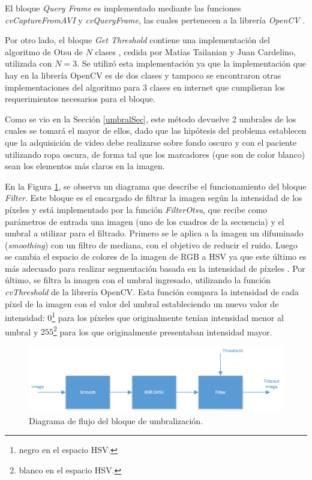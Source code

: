 El bloque \emph{Query Frame} es implementado mediante las funciones \emph{cvCaptureFromAVI} y \emph{cvQueryFrame}, las cuales pertenecen a la librería \emph{OpenCV} \cite{opencv}.


Por otro lado, el bloque \emph{Get Threshold} contiene una implementación del algoritmo de Otsu de $N$ clases \cite{implementacionOtsu}, cedida por Matías Tailanian y Juan Cardelino, utilizada con $N=3$. Se utilizó esta implementación ya que la implementación que hay en la librería OpenCV es de dos clases y tampoco se encontraron otras implementaciones del algoritmo para 3 clases en internet que cumplieran los requerimientos necesarios para el bloque.

 Como se vio en la Sección \ref{umbralSec}, este método devuelve 2 umbrales de los cuales se tomará el mayor de ellos, dado que las hipótesis del problema establecen que la adquisición de video debe realizarse sobre fondo oscuro y con el paciente utilizando ropa oscura, de forma tal que los marcadores (que son de color blanco) sean los elementos más claros en la imagen.

En la Figura \ref{diagramaumbralizacion}, se observa un diagrama que describe el funcionamiento del bloque \emph{Filter}. Este bloque es el encargado de filtrar la imagen según la intensidad de los píxeles y está implementado por la función \emph{FilterOtsu}, que recibe como parámetros de entrada una imagen (uno de los cuadros de la secuencia) y el umbral a utilizar para el filtrado. Primero se le aplica a la imagen un difuminado (\textit{smoothing}) con un filtro de mediana, con el objetivo de reducir el ruido. Luego se cambia el espacio de colores de la imagen de RGB a HSV ya que este último es más adecuado para realizar segmentación basada en la intensidad de píxeles \cite{HSV}. Por último, se filtra la imagen con el umbral ingresado, utilizando la función \emph{cvThreshold} de la librería OpenCV. Esta función compara la intensidad de cada píxel de la imagen con el valor del umbral estableciendo un nuevo valor de intensidad: $0$\footnote{negro en el espacio HSV.} para los píxeles que originalmente tenían intensidad menor al umbral y $255$\footnote{blanco en el espacio HSV.} para los que originalmente presentaban intensidad mayor.

\begin{figure}[ht!]
\begin{center}
\includegraphics[scale=0.7]{img/diagrama_umbralizacion.png}
\end{center}
\caption{Diagrama de flujo del bloque de umbralización.}
\label{diagramaumbralizacion}
\end{figure}

